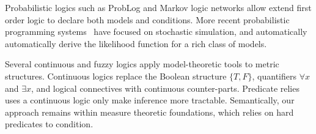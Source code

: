 Probabilistic logics such as ProbLog \cite{richardson2006markov} and Markov logic networks \cite{de2007problog} allow extend first order logic to declare both models and conditions.
More recent probabilistic programming systems~\citep{milch20071, wood2014new,mansinghka2014venture,goodman2008church,carpenter2017stan} have focused on stochastic simulation, and automatically automatically derive the likelihood function for a rich class of models.



Several continuous \cite{levin2000continuous} and fuzzy \cite{klir1995fuzzy} logics apply model-theoretic tools to metric structures.
Continuous logics replace the Boolean structure $\{T, F\}$, quantifiers $\forall x$ and $\exists x$, and logical connectives with continuous counter-parts.
Predicate relies uses a continuous logic only make inference more tractable. Semantically, our approach remains within measure theoretic foundations, which relies on hard predicates to condition.



